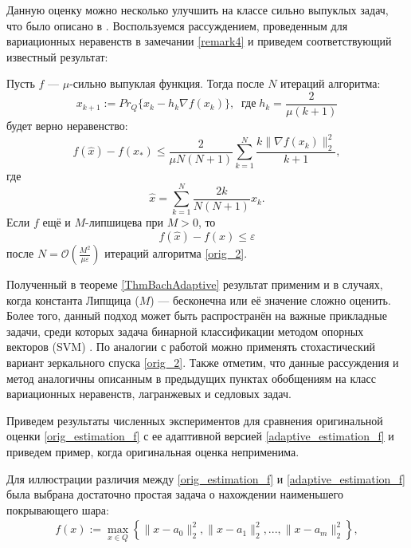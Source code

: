 Данную оценку можно несколько улучшить на классе сильно выпуклых задач, что было описано в \cite{Stonyakin_2021}. Воспользуемся рассуждением, проведенным для вариационных неравенств в замечании \ref{remark4} и приведем соответствующий известный результат:
\begin{theorem}\label{ThmBachAdaptive}
    Пусть $f$ --- $\mu$-сильно выпуклая функция. Тогда после $N$ итераций алгоритма:
    \begin{equation}\label{orig_2}
        x_{k+1} := Pr_{Q}\{x_k - h_k \nabla f(x_k) \}, \;\; \textit{где} \; h_k = \frac{2}{\mu (k+1)}
    \end{equation}
    будет верно неравенство:
    \begin{equation}\label{adaptive_estimation_f}
        f(\widehat{x}) - f(x_*) \leq \frac{2}{\mu N (N+1)} \sum_{k=1}^{N} \frac{k \|\nabla f(x_k)\|_2^2}{k+1},
    \end{equation}
    где
    $$
        \widehat{x} = \sum_{k=1}^{N} \frac{2 k}{N (N+1)} x_k.
    $$
    Если $f$ ещё и $M$-липшицева при $M >0$, то
    $$
         f(\widehat{x}) - f(x) \leq \varepsilon
    $$
    после $N = \mathcal{O}(\frac{M^2}{\mu\varepsilon})$ итераций алгоритма \eqref{orig_2}.
\end{theorem}

Полученный в теореме \ref{ThmBachAdaptive} результат применим и в случаях, когда константа Липщица ($M$) --- бесконечна или её значение сложно оценить. Более того, данный подход может быть распространён на важные прикладные задачи, среди которых задача бинарной классификации методом опорных векторов (SVM) \cite{Bach_2012}. По аналогии с работой \cite{Bach_2012} можно применять стохастический вариант зеркального спуска \eqref{orig_2}. Также отметим, что данные рассуждения и метод аналогичны описанным в предыдущих пунктах обобщениям на класс вариационных неравенств, лагранжевых и седловых задач. 

Приведем результаты численных экспериментов для сравнения оригинальной оценки \eqref{orig_estimation_f} с ее адаптивной версией \eqref{adaptive_estimation_f} и приведем пример, когда оригинальная оценка неприменима. 

Для иллюстрации различия между \eqref{orig_estimation_f} и \eqref{adaptive_estimation_f} была выбрана достаточно простая задача о нахождении наименьшего покрывающего шара:
\begin{gather}\label{sphere_cover_strongly}
    f(x) := \max_{x\in Q}\left\{\|x - a_0\|_2^2, \|x - a_1\|_2^2, ..., \|x - a_m\|_2^2\right\},
\end{gather}

